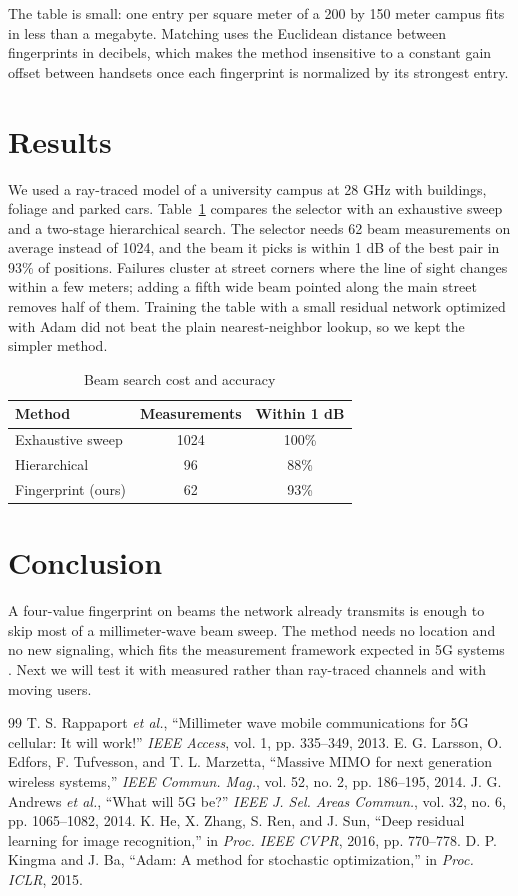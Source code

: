 \documentclass[conference]{IEEEtran}
\begin{document}
The table is small: one entry per square meter of a 200 by 150 meter campus fits in less than a megabyte. Matching uses
the Euclidean distance between fingerprints in decibels, which makes the method insensitive to a constant gain offset
between handsets once each fingerprint is normalized by its strongest entry.

\section{Results}
We used a ray-traced model of a university campus at 28 GHz with buildings, foliage and parked cars. Table~\ref{t1}
compares the selector with an exhaustive sweep and a two-stage hierarchical search. The selector needs 62 beam
measurements on average instead of 1024, and the beam it picks is within 1 dB of the best pair in 93\% of positions.
Failures cluster at street corners where the line of sight changes within a few meters; adding a fifth wide beam
pointed along the main street removes half of them. Training the table with a small residual network \cite{he}
optimized with Adam \cite{kingma} did not beat the plain nearest-neighbor lookup, so we kept the simpler method.

\begin{table}[t]
\caption{Beam search cost and accuracy\label{t1}}
\centering
\begin{tabular}{lcc}
\hline
Method & Measurements & Within 1 dB \\
\hline
Exhaustive sweep & 1024 & 100\% \\
Hierarchical & 96 & 88\% \\
Fingerprint (ours) & 62 & 93\% \\
\hline
\end{tabular}
\end{table}

\section{Conclusion}
A four-value fingerprint on beams the network already transmits is enough to skip most of a millimeter-wave beam
sweep. The method needs no location and no new signaling, which fits the measurement framework expected in 5G
systems \cite{andrews}. Next we will test it with measured rather than ray-traced channels and with moving users.

\begin{thebibliography}{99}
 T. S. Rappaport \emph{et al.}, ``Millimeter wave mobile communications for 5G cellular: It will work!'' \emph{IEEE Access}, vol. 1, pp. 335--349, 2013.
 E. G. Larsson, O. Edfors, F. Tufvesson, and T. L. Marzetta, ``Massive MIMO for next generation wireless systems,'' \emph{IEEE Commun. Mag.}, vol. 52, no. 2, pp. 186--195, 2014.
 J. G. Andrews \emph{et al.}, ``What will 5G be?'' \emph{IEEE J. Sel. Areas Commun.}, vol. 32, no. 6, pp. 1065--1082, 2014.
 K. He, X. Zhang, S. Ren, and J. Sun, ``Deep residual learning for image recognition,'' in \emph{Proc. IEEE CVPR}, 2016, pp. 770--778.
 D. P. Kingma and J. Ba, ``Adam: A method for stochastic optimization,'' in \emph{Proc. ICLR}, 2015.
\end{thebibliography}
\end{document}
